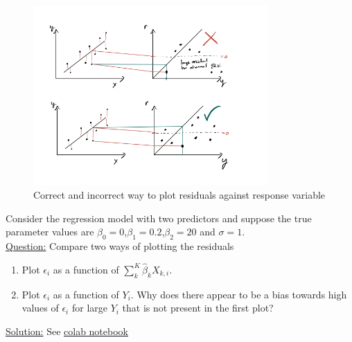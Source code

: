 \begin{figure}[h]
    \centering
    \includegraphics[width=0.8\textwidth]{./../figures/res}
    \caption{Correct and incorrect way to plot residuals against response variable }
    \label{fig:res}
\end{figure}

\begin{example}\label{ex:res}

Consider the regression model with two predictors and suppose the true parameter values are $\beta_0=0$,$\beta_1 = 0.2$,$\beta_2 = 20$ and $\sigma = 1$. \\


\noindent
\underline{Question:} Compare two ways of plotting the residuals 
\begin{enumerate}[label=(\alph*)]
\item Plot $\epsilon_i$ as a function of $\sum_k^{K}\hat{\beta}_kX_{k,i}$. 
\item Plot $\epsilon_i$ as a function of $Y_i$. Why does there appear to be a bias towards high values of $\epsilon_i$ for large $Y_i$ that is not present in the first plot? \\
\end{enumerate}


\noindent
\underline{Solution:} See \href{https://colab.research.google.com/drive/1UTUUfWTpmazSa40sqLUWAojRi2kGJM-O?usp=sharing}{colab notebook}

\end{example}

